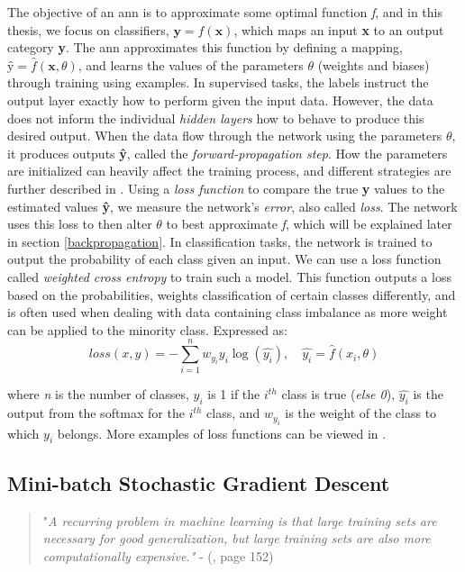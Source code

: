     The objective of an \gls{ann} is to approximate some optimal function \textit{f}, and in this thesis, we focus on classifiers, $\textbf{y} = f(\textbf{x})$, which maps an input \textbf{x} to an output category \textbf{y}. The \gls{ann} approximates this function by defining a mapping, $\textbf{\^{y}} = \hat{f}(\textbf{x},\theta)$, and learns the values of the parameters \textit{$\theta$} (weights and biases) through training using examples. In supervised tasks, the labels instruct the output layer exactly how to perform given the input data. However, the data does not inform the individual \textit{hidden layers} how to behave to produce this desired output. When the data flow through the network using the parameters $\theta$, it produces outputs \textbf{\^{y}}, called the \textit{forward-propagation step}. How the parameters are initialized can heavily affect the training process, and different strategies are further described in \citet{Goodfellow-et-al-2016}. Using a \textit{loss function} to compare the true \textbf{y} values to the estimated values \textbf{\^{y}}, we measure the network's \textit{error}, also called \textit{loss}. The network uses this loss to then alter $\theta$ to best approximate \textit{f}, which will be explained later in section \ref{backpropagation}. In classification tasks, the network is trained to output the probability of each class given an input\cite{ho2019real_weighted_cross_entropy}. We can use a loss function called \textit{weighted cross entropy} to train such a model. This function outputs a loss based on the probabilities, weights classification of certain classes differently, and is often used when dealing with data containing class imbalance as more weight can be applied to the minority class. Expressed as:
        \begin{equation} \label{cross_entropy}
            loss(x,y) = - \sum^{n}_{i=1} w_{y_{i}}y_{i}\log(\hat{y_{i}}), \quad \hat{y_{i}} = \hat{f}(x_i,\theta)
        \end{equation}
    
    where \textit{n} is the number of classes, $y_{i}$ is 1 if the $i^{th}$ class is true (\textit{else 0}), $\hat{y_{i}}$ is the output from the softmax for the $i^{th}$ class, and $w_{y_{i}}$ is the weight of the class to which $y_{i}$ belongs. More examples of loss functions can be viewed in \citeauthor{mishra2017deep}\cite{mishra2017deep}.
    


\subsection{Mini-batch Stochastic Gradient Descent} \label{batch learning}
        \begin{quote}
        "\textit{A recurring problem in machine learning is that large training sets are necessary for good generalization, but large training sets are also more computationally
        expensive."} - (\citeauthor{Goodfellow-et-al-2016}\citeyear{Goodfellow-et-al-2016}, page 152)
    \end{quote}
    
